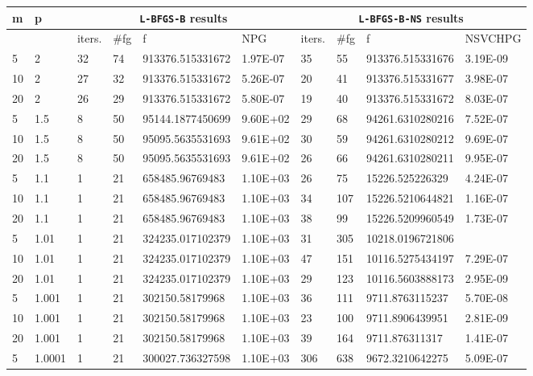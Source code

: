 \begin{table}
  \tiny
  \begin{center}
    \begin{tabular}{|l|l|l|l|l|l|l|l|l|l|}
      \hline
      m  &  p  & \multicolumn{4}{|c|}{\texttt{L-BFGS-B} results} & \multicolumn{4}{|c|}{\texttt{L-BFGS-B-NS} results} \\ \hline
      &  & iters. & \#fg & f & NPG & iters. & \#fg & f & NSVCHPG \\ \hline
      5 & 2 & 32 & 74 & 913376.515331672 & 1.97E-07 & 35 & 55 & 913376.515331676 & 3.19E-09\\
      10 & 2 & 27 & 32 & 913376.515331672 & 5.26E-07 & 20 & 41 & 913376.515331677 & 3.98E-07\\
      20 & 2 & 26 & 29 & 913376.515331672 & 5.80E-07 & 19 & 40 & 913376.515331672 & 8.03E-07\\
      5 & 1.5 & 8 & 50 & 95144.1877450699 & 9.60E+02 & 29 & 68 & 94261.6310280216 & 7.52E-07\\
      10 & 1.5 & 8 & 50 & 95095.5635531693 & 9.61E+02 & 30 & 59 & 94261.6310280212 & 9.69E-07\\
      20 & 1.5 & 8 & 50 & 95095.5635531693 & 9.61E+02 & 26 & 66 & 94261.6310280211 & 9.95E-07\\
      5 & 1.1 & 1 & 21 & 658485.96769483 & 1.10E+03 & 26 & 75 & 15226.525226329 & 4.24E-07\\
      10 & 1.1 & 1 & 21 & 658485.96769483 & 1.10E+03 & 34 & 107 & 15226.5210644821 & 1.16E-07\\
      20 & 1.1 & 1 & 21 & 658485.96769483 & 1.10E+03 & 38 & 99 & 15226.5209960549 & 1.73E-07\\
      5 & 1.01 & 1 & 21 & 324235.017102379 & 1.10E+03 & 31 & 305 & 10218.0196721806 & \\
      10 & 1.01 & 1 & 21 & 324235.017102379 & 1.10E+03 & 47 & 151 & 10116.5275434197 & 7.29E-07\\
      20 & 1.01 & 1 & 21 & 324235.017102379 & 1.10E+03 & 29 & 123 & 10116.5603888173 & 2.95E-09\\
      5 & 1.001 & 1 & 21 & 302150.58179968 & 1.10E+03 & 36 & 111 & 9711.8763115237 & 5.70E-08\\
      10 & 1.001 & 1 & 21 & 302150.58179968 & 1.10E+03 & 23 & 100 & 9711.8906439951 & 2.81E-09\\
      20 & 1.001 & 1 & 21 & 302150.58179968 & 1.10E+03 & 39 & 164 & 9711.876311317 & 1.41E-07\\
      5 & 1.0001 & 1 & 21 & 300027.736327598 & 1.10E+03 & 306 & 638 & 9672.3210642275 & 5.09E-07\\

\end{tabular}
\end{center}
\end{table}
